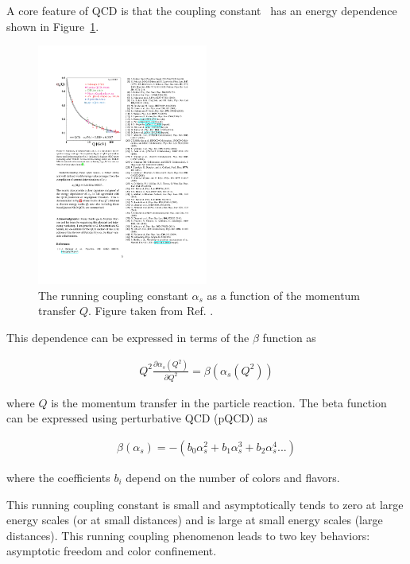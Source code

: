 A core feature of QCD is that the coupling constant \alphas\ has an energy dependence shown in Figure~\ref{fig:running_coupling}. 

\begin{figure}[htbp]
\begin{center}
\includegraphics[width=0.5\textwidth]{figures/theory/running_coupling}
\caption{The running coupling constant $\alpha_s$ as a function of the momentum transfer $Q$. Figure taken from Ref. \cite{Beringer:1481544}. }
\label{fig:running_coupling}
\end{center}
\end{figure}

This dependence can be expressed in terms of the $\beta$ function as

\begin{align}
Q^2 \frac{\partial \alpha_s (Q^2)}{\partial Q^2} = \beta(\alpha_s (Q^2))
\end{align}

where $Q$ is the momentum transfer in the particle reaction. The beta function can be expressed using perturbative QCD (pQCD) as

\begin{align}
\beta( \alpha_s ) = - (b_0 \alpha_s^2 + b_1 \alpha_s^3 + b_2 \alpha_s^4... )
\end{align}

where the coefficients $b_i$ depend on the number of colors and flavors.

This running coupling constant is small and asymptotically tends to zero at large energy scales (or at small distances) and is large at small energy scales (large distances). This running coupling phenomenon leads to two key behaviors: asymptotic freedom and color confinement. 


